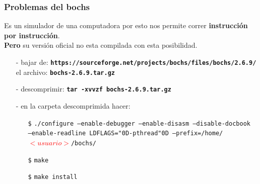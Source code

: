 \documentclass[aspectratio=169]{beamer}
\begin{document}
\begin{frame}
    \frametitle{Problemas del bochs}
    Es un simulador de una computadora por esto nos permite correr \textbf{instrucción por instrucción}.\\
    \vspace{0.2cm}
    \textbf{Pero} su versión oficial no esta compilada con esta posibilidad.
    \vspace{0.4cm}
    \pause
    \begin{itemize}
    \setlength\itemsep{1em}
    \item[-] bajar de: \small \textbf{\texttt{https://sourceforge.net/projects/bochs/files/bochs/2.6.9/}} \\
    \normalsize el archivo: \small \textbf{\texttt{bochs-2.6.9.tar.gz}}
    \pause
    \item[-] \normalsize descomprimir: \small \textbf{\texttt{tar -xvvzf bochs-2.6.9.tar.gz}}
    \pause
    \item[-] \normalsize en la carpeta descomprimida hacer:\\
    \vspace{0.1cm}
    \begin{itemize}
    \setlength\itemsep{0.5em}
    \item[\texttt{\$}] \small \texttt{./configure --enable-debugger --enable-disasm --disable-docbook\\ 
    --enable-readline LDFLAGS={\char"0D}-pthread{\char"0D}  --prefix=/home/\textcolor{red}{$<usuario>$}/bochs/}
    \item[\texttt{\$}] \small \texttt{make}
    \item[\texttt{\$}] \small \texttt{make install}
    \end{itemize}
    \end{itemize}
\end{frame}
\end{document}
